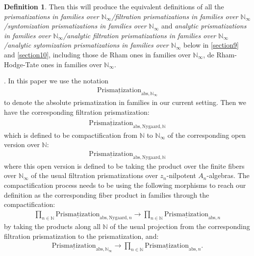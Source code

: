 \documentclass[12pt]{article}
\theoremstyle{definition}
\newtheorem{definition}{Definition}
\begin{document}
\begin{definition}
{Then this will produce the equivalent definitions of all the \textit{prismatizations in families over $\mathbb{N}_\infty$/filtration prismatizations in families over $\mathbb{N}_\infty$/syntomization prismatizations in families over $\mathbb{N}_\infty$} and \textit{analytic prismatizations in families over $\mathbb{N}_\infty$/analytic filtration prismatizations in families over $\mathbb{N}_\infty$/analytic sytomization  prismatizations in families over $\mathbb{N}_\infty$} below in \cref{section9} and \cref{section10}, including those de Rham ones in families over $\mathbb{N}_\infty$, de Rham-Hodge-Tate ones in families over $\mathbb{N}_\infty$.

}. In this paper we use the notation 
\begin{align}
\underline{\mathrm{Prismatization}}_{\mathrm{abs},\mathbb{N}_\infty}
\end{align}
to denote the absolute prismatization in families in our current setting. Then we have the corresponding filtration prismatization:
\begin{align}
\overline{\underline{\mathrm{Prismatization}}}_{\mathrm{abs},\mathrm{Nygaard},\mathbb{N}}
\end{align}
which is defined to be compactification from $\mathbb{N}$ to $\mathbb{N}_\infty$ of the corresponding open version over $\mathbb{N}$:
\begin{align}
{\underline{\mathrm{Prismatization}}}_{\mathrm{abs},\mathrm{Nygaard},\mathbb{N}}
\end{align}
where this open version is defined to be taking the product over the finite fibers over $\mathbb{N}_\infty$ of the usual filtration prismatizations over $z_n$-nilpotent $A_n$-algebras. The compactification process needs to be using the following morphisms to reach our definition as the corresponding fiber product in families through the compactification:
\begin{align}
\prod_{n\in \mathbb{N}} {\underline{\mathrm{Prismatization}}}_{\mathrm{abs},\mathrm{Nygaard},n}\rightarrow  \prod_{n\in \mathbb{N}} {\underline{\mathrm{Prismatization}}}_{\mathrm{abs},n}
\end{align}
by taking the products along all $\mathbb{N}$ of the usual projection from the corresponding filtration prismatization to the prismatization, and:
\begin{align}
{\underline{\mathrm{Prismatization}}}_{\mathrm{abs},\mathbb{N}_\infty}\rightarrow  \prod_{n\in \mathbb{N}} {\underline{\mathrm{Prismatization}}}_{\mathrm{abs},n}.
\end{align}

\end{definition}
\end{document}
